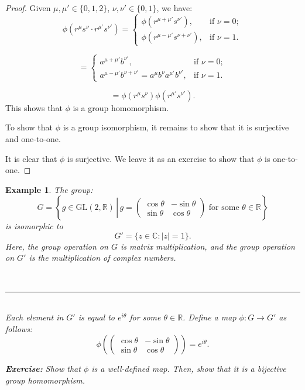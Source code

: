 \documentclass[a4paper,12pt]{report}
\newcommand{\abs}[1]{\left|#1\right|}
\newcommand{\ra}{\longrightarrow}
\newcounter{statement}
\numberwithin{statement}{chapter}
\newtheorem{eg}[statement]{\bf Example}
\numberwithin{equation}{chapter}
\numberwithin{section}{chapter}
\numberwithin{subsection}{section}
\begin{document}
\begin{proof}
Given $\mu, \mu' \in \{0, 1, 2\}$, $\nu, \nu' \in \{0, 1\}$, we have:
\[
\phi(r^\mu s^\nu \cdot r^{\mu'}s^{\nu'}) =
\begin{cases}
\phi(r^{\mu + \mu'}s^{\nu'}),&\text{if } \nu = 0;\\
\phi(r^{\mu - \mu'}s^{\nu + \nu'}),&\text{if } \nu = 1.
\end{cases}
\]

\[
=
\begin{cases}
a^{\mu + \mu'}b^{\nu'},&\text{if } \nu = 0;\\
a^{\mu - \mu'}b^{\nu + \nu'} = a^{\mu}b^{\nu}a^{\mu'}b^{\nu'},&\text{if } \nu = 1.
\end{cases}
\]

\[
=\phi(r^\mu s^\nu)\phi(r^{\mu'}s^{\nu'}).
\]
This shows that $\phi$ is a group homomorphism.




To show that $\phi$ is a group isomorphism,
it remains to show that it is surjective and one-to-one.



It is clear that $\phi$ is surjective.  We leave it as an exercise
to show that $\phi$ is one-to-one.


\end{proof}




\begin{eg}
The group:
\[
G = \left\{g \in \mathrm{GL}(2, \mathbb{R}) \,\left|\,
g = \left(
\begin{matrix}
\cos \theta & -\sin \theta\\
\sin \theta & \cos \theta
\end{matrix}
\right) \text{ for some } \theta \in \mathbb{R}
\right.
\right\}
\]
is isomorphic to
\[
G' = \{z \in \mathbb{C} : \abs{z} = 1\}.
\]
Here, the group operation on $G$ is matrix multiplication, and the group operation on $G'$ is the multiplication of complex numbers.

\quad\\\hrule
\quad\\


Each element in $G'$ is equal to $e^{i\theta}$ for some $\theta \in \mathbb{R}$.
Define a map $\phi : G \ra G'$ as follows:
\[
\phi\left(\left(
\begin{matrix}
\cos \theta & -\sin \theta\\
\sin \theta & \cos \theta
\end{matrix}
\right)\right) = e^{i\theta}.
\]

 {\bf Exercise:} 
Show that $\phi$ is a well-defined map.
Then, show that it is a bijective group homomorphism.
\end{eg}
\end{document}
